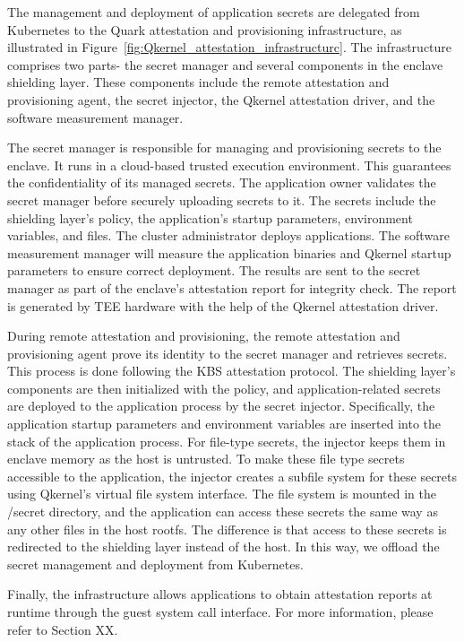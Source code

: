 The management and deployment of application secrets are delegated from Kubernetes to the Quark attestation and provisioning infrastructure, as illustrated in Figure~\ref{fig:Qkernel_attestation_infrastructurc}. The infrastructure comprises two 
parts- the secret manager and several components in the enclave shielding layer. These components include the remote attestation and provisioning agent, the secret injector, the Qkernel attestation driver, and the software measurement manager.

The secret manager is responsible for managing and provisioning secrets to the enclave. It runs in a cloud-based trusted execution environment. This guarantees the confidentiality of its managed secrets. The application owner validates the secret 
manager before securely uploading secrets to it. The secrets include the shielding layer's policy, the application's startup parameters, environment variables, and files. The cluster administrator deploys applications. The software measurement 
manager will measure the application binaries and Qkernel startup parameters to ensure correct deployment. The results are sent to the secret manager as part of the enclave's attestation report for integrity check. The report is generated by TEE 
hardware with the help of the Qkernel attestation driver.

During remote attestation and provisioning, the remote attestation and provisioning agent prove its identity to the secret manager and retrieves secrets. This process is done following the KBS attestation protocol. The shielding layer's components 
are then initialized with the policy, and application-related secrets are deployed to the application process by the secret injector. Specifically, the application startup parameters and environment variables are inserted into the stack of the 
application process. For file-type secrets, the injector keeps them in enclave memory as the host is untrusted. To make these file type secrets accessible to the application, the injector creates a subfile system for these secrets using Qkernel's 
virtual file system interface. The file system is mounted in the /secret directory, and the application can access these secrets the same way as any other files in the host rootfs. The difference is that access to these secrets is redirected to the shielding layer instead of the host. In this way, we offload the secret management and deployment from Kubernetes.

Finally, the infrastructure allows applications to obtain attestation reports at runtime through the guest system call interface. For more information, please refer to Section XX.

